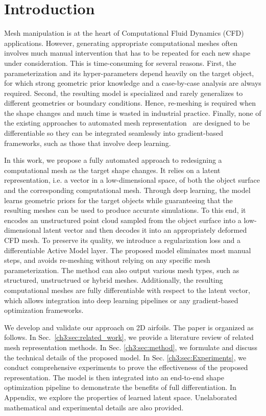 \section{Introduction}

Mesh manipulation is at the heart of Computational Fluid Dynamics (CFD) applications. However, generating appropriate computational meshes often involves much manual intervention that has to be repeated for each new shape under consideration. This is time-consuming for several reasons. First, the parameterization and its hyper-parameters depend heavily on the target object, for which strong geometric prior knowledge and a case-by-case analysis are always required. Second, the resulting model is specialized and rarely generalizes to different geometries or boundary conditions. Hence, re-meshing is required when the shape changes and much time is wasted in industrial practice. Finally, none of the existing approaches to automated mesh representation~\cite{aa.Robinson2001, aa.Poole2015, aa.Masters2017,aa.Li2019, aa.Kedward2020, aa.Viswanath2011, aa.Constantine2014,aa.Li2020,aa.Li2021} are designed to be differentiable so they can be integrated seamlessly into gradient-based frameworks, such as those that involve deep learning.

In this work, we propose a fully automated approach to redesigning a computational mesh as the target shape changes. It relies on a latent representation, i.e. a vector in a low-dimensional space, of both the object surface and the corresponding computational mesh. Through deep learning, the model learns geometric priors for the target objects while guaranteeing that the resulting meshes can be used to produce accurate simulations. To this end, it encodes an unstructured point cloud sampled from the object surface into a low-dimensional latent vector and then decodes it into an appropriately deformed CFD mesh. To preserve its quality, we introduce a regularization loss and a differentiable Active Model layer. The proposed model eliminates most manual steps, and avoids re-meshing without relying on any specific mesh parameterization. The method can also output various mesh types, such as structured, unstructrued or hybrid meshes. Additionally, the resulting computational meshes are fully differentiable with respect to the latent vector, which allows integration into deep learning pipelines or any gradient-based optimization frameworks. 

We develop and validate our approach on 2D airfoils. The paper is organized as follows.  In Sec.~\ref{ch3:sec:related_work}, we provide a literature review of related mesh representation methods. In Sec. \ref{ch3:sec:method}, we formulate and discuss the technical details of the proposed model. In Sec. \ref{ch3:sec:Experiments}, we conduct comprehensive experiments to prove the effectiveness of the proposed representation. The model is then integrated into an end-to-end shape optimization pipeline to demonstrate the benefits of full differentiation.
In Appendix, we explore the properties of learned latent space. Unelaborated mathematical and experimental details are also provided.